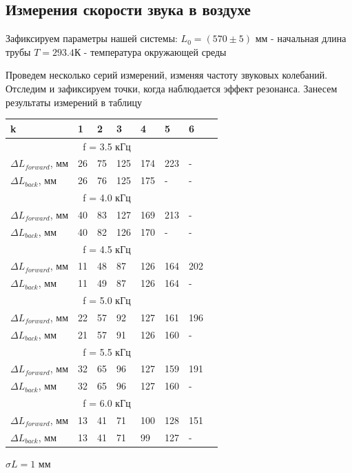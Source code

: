\documentclass[12pt,a4paper]{article}
\begin{document}
\subsection*{Измерения скорости звука в воздухе}
Зафиксируем параметры нашей системы: \hfill \break 
$L_{0} = (570 \pm 5)$ мм - начальная длина трубы \hfill \break 
$T = 293.4$К - температура окружающей среды 

Проведем несколько серий измерений, изменяя частоту звуковых колебаний. Отследим и зафиксируем точки, когда наблюдается эффект резонанса. Занесем результаты измерений в таблицу
\begin{center}

\begin{tabular}{|p{}|p{}|p{}|p{}|p{}|p{}|p{}|p{}|}
\hline 
k & 1  & 2 & 3 & 4 & 5 & 6 \\ 
\hline 
\multicolumn{7}{|c|}{f = 3.5 кГц} \\ 
\hline 
$\Delta{L_{forward}}$, мм  & 26 & 75 & 125 & 174 & 223 & - \\ 
\hline 
$\Delta{L_{back}}$, мм  & 26 & 76 & 125 & 175 & - & - \\ 
\hline 
\multicolumn{7}{|c|}{f = 4.0 кГц} \\ 
\hline 
$\Delta{L_{forward}}$, мм  & 40 & 83 & 127 & 169 & 213 & - \\ 
\hline 
$\Delta{L_{back}}$, мм  & 40 & 82 & 126 & 170 & - & - \\ 
\hline 
\multicolumn{7}{|c|}{f = 4.5 кГц} \\ 
\hline 
$\Delta{L_{forward}}$, мм  & 11 & 48 & 87 & 126 & 164 & 202 \\ 
\hline 
$\Delta{L_{back}}$, мм  & 11 & 49 & 87 & 126 & 164 & - \\ 
\hline 
\multicolumn{7}{|c|}{f = 5.0 кГц} \\ 
\hline 
$\Delta{L_{forward}}$, мм  & 22 & 57 & 92 & 127 & 161 & 196 \\ 
\hline 
$\Delta{L_{back}}$, мм  & 21 & 57 & 91 & 126 & 160 & - \\ 
\hline 
\multicolumn{7}{|c|}{f = 5.5 кГц} \\ 
\hline 
$\Delta{L_{forward}}$, мм  & 32 & 65 & 96 & 127 & 159 & 191 \\ 
\hline 
$\Delta{L_{back}}$, мм  & 32 & 65 & 96 & 127 & 160 & - \\ 
\hline 
\multicolumn{7}{|c|}{f = 6.0 кГц} \\ 
\hline 
$\Delta{L_{forward}}$, мм  & 13 & 41 & 71 & 100 & 128 & 151 \\ 
\hline 
$\Delta{L_{back}}$, мм  & 13 & 41 & 71 & 99 & 127 & - \\ 
\hline 
\end{tabular} 
\end{center}
$\sigma{L} = 1$ мм
\end{document}
